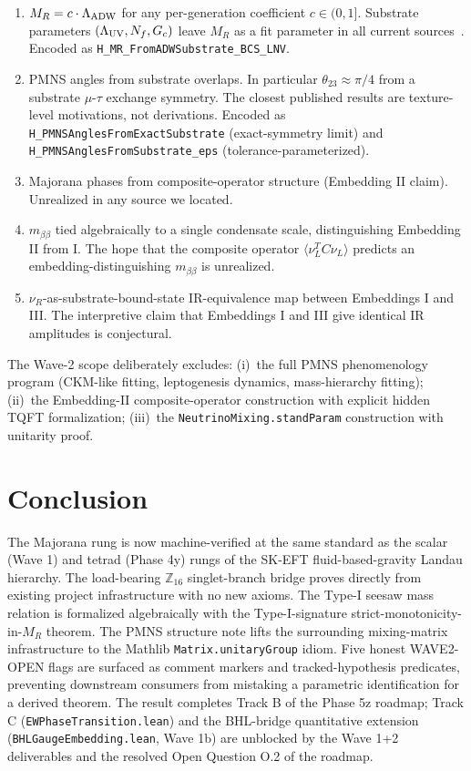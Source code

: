 \documentclass[aps,prd,twocolumn,showpacs,superscriptaddress,nofootinbib]{revtex4-2}
\newcommand{\HeavyMaj}{M_R}
\newcommand{\LambdaADW}{\Lambda_{\rm ADW}}
\newcommand{\mbb}{m_{\beta\beta}}
\begin{document}
\begin{enumerate}
\item[\textbf{O-1}] $\HeavyMaj = c \cdot \LambdaADW$ for any
  per-generation coefficient $c \in (0, 1]$. Substrate parameters
  $(\Lambda_{\rm UV}, N_f, G_c)$ leave $\HeavyMaj$ as a fit parameter
  in all current sources~\cite{ADW,WetterichSpinor2013,Volovik2024Spinor}.
  Encoded as \texttt{H\_MR\_FromADWSubstrate\_BCS\_LNV}.
\item[\textbf{O-2}] PMNS angles from substrate overlaps. In particular
  $\theta_{23} \approx \pi/4$ from a substrate $\mu$-$\tau$ exchange
  symmetry. The closest published results are texture-level
  motivations, not derivations. Encoded as
  \texttt{H\_PMNSAnglesFromExactSubstrate} (exact-symmetry limit) and
  \texttt{H\_PMNSAnglesFromSubstrate\_eps} (tolerance-parameterized).
\item[\textbf{O-3}] Majorana phases from composite-operator structure
  (Embedding II claim). Unrealized in any source we located.
\item[\textbf{O-4}] $\mbb$ tied algebraically to a single condensate
  scale, distinguishing Embedding II from I. The hope that the
  composite operator $\langle\nu_L^T C \nu_L\rangle$ predicts an
  embedding-distinguishing $\mbb$ is unrealized.
\item[\textbf{O-5}] $\nu_R$-as-substrate-bound-state IR-equivalence
  map between Embeddings I and III. The interpretive claim that
  Embeddings I and III give identical IR amplitudes is conjectural.
\end{enumerate}

The Wave-2 scope deliberately excludes: (i)~the full PMNS phenomenology
program (CKM-like fitting, leptogenesis dynamics, mass-hierarchy
fitting); (ii)~the Embedding-II composite-operator construction with
explicit hidden TQFT formalization; (iii)~the
\texttt{NeutrinoMixing.standParam} construction with unitarity proof.

\section{Conclusion}
\label{sec:conclusion}

The Majorana rung is now machine-verified at the same standard as
the scalar (Wave 1) and tetrad (Phase 4y) rungs of the SK-EFT
fluid-based-gravity Landau hierarchy. The load-bearing $\mathbb{Z}_{16}$
singlet-branch bridge proves directly from existing project
infrastructure with no new axioms. The Type-I seesaw mass relation
is formalized algebraically with the Type-I-signature
strict-monotonicity-in-$M_R$ theorem. The PMNS structure note lifts
the surrounding mixing-matrix infrastructure to the Mathlib
\texttt{Matrix.unitaryGroup} idiom. Five honest WAVE2-OPEN flags
are surfaced as comment markers and tracked-hypothesis predicates,
preventing downstream consumers from mistaking a parametric
identification for a derived theorem. The result completes Track B
of the Phase 5z roadmap; Track C
(\texttt{EWPhaseTransition.lean}) and the BHL-bridge quantitative
extension (\texttt{BHLGaugeEmbedding.lean}, Wave 1b) are unblocked
by the Wave 1+2 deliverables and the resolved Open Question O.2 of
the roadmap.
\end{document}
